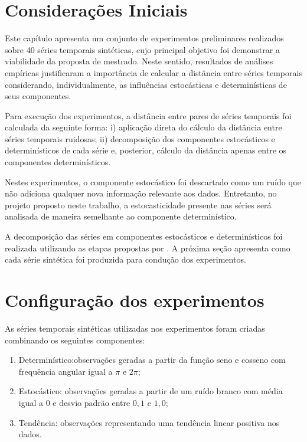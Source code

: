 \label{experimentos}

\section{Considerações Iniciais}

Este capítulo apresenta um conjunto de experimentos preliminares realizados sobre 40 séries temporais sintéticas, cujo principal objetivo foi demonstrar a viabilidade da proposta de mestrado. Neste sentido, resultados de análises empíricas justificaram a importância de calcular a distância entre séries temporais considerando, individualmente, as influências estocásticas e determinísticas de seus componentes.

Para execução dos experimentos, a distância entre pares de séries temporais foi calculada da seguinte forma: i) aplicação direta do cálculo da distância entre séries temporais ruidosas; ii) decomposição dos componentes estocásticos e determinísticos de cada série e, posterior, cálculo da distância apenas entre os componentes determinísticos.

Nestes experimentos, o componente estocástico foi descartado como um ruído que não adiciona qualquer nova informação relevante aos dados. Entretanto, no projeto proposto neste trabalho, a estocasticidade presente nas séries será analisada de maneira semelhante ao componente determinístico.

A decomposição das séries em componentes estocásticos e determinísticos foi realizada utilizando as etapas propostas por . A próxima seção apresenta como cada série sintética foi produzida para condução dos experimentos.

\section{Configuração dos experimentos}\label{conf:exp}

As séries temporais sintéticas utilizadas nos experimentos foram criadas combinando os seguintes componentes: 

\begin{enumerate}
\item Determinístico:observações geradas a partir da função seno e cosseno com frequência angular igual a $\pi$ e $2\pi$;
\item Estocástico: observações geradas a partir de um ruído branco com média igual a $0$ e desvio padrão entre $0,1$ e $1,0$;
\item Tendência: observações representando uma tendência linear positiva nos dados.
\end{enumerate}

